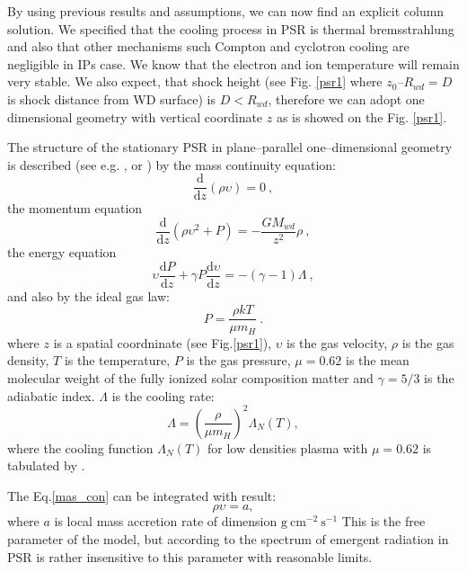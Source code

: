 \documentclass[oneside,a4paper,11pt]{report}
\begin{document}
By using previous results and assumptions, we can now find an explicit column solution. We specified 
that the cooling process in PSR is thermal bremsstrahlung and also that other mechanisms such Compton 
and cyclotron cooling are negligible in IPs case. We know that the electron and ion temperature will 
remain very stable. We also expect, that shock height (see Fig. \ref{psr1} where $z_0 – R_{wd} = D$ 
is shock distance from WD surface) is $D < R_{wd}$, therefore we can adopt one dimensional geometry 
with vertical coordinate $z$ as is showed on the Fig. \ref{psr1}.

The structure of the stationary PSR in plane--parallel one--dimensional geometry is described
(see e.g. \citet{2005A&A...435..191S}, \citet{1999MNRAS.306..684C} or \citet{accpower:1}) by the
mass continuity equation:
\begin{equation}
 \label{mas_con}
\frac{\mathrm{d}}{\mathrm{d}z}(\rho \upsilon) = 0   \:,
\end{equation}
the momentum equation
\begin{equation}
 \label{momentum_eq}
\frac{\mathrm{d}}{\mathrm{d}z}(\rho \upsilon^2 + P) = -\frac{GM_{wd}}{z^2}\rho             \:,
\end{equation}
the energy equation 
\begin{equation}
 \label{ener_eq}
\upsilon \frac{\mathrm{d}P}{\mathrm{d}z} + \gamma P \frac{\mathrm{d}\upsilon}{\mathrm{d}z} = -(\gamma -1)\Lambda    \:,
\end{equation}
and also by the ideal gas law:
\begin{equation}
 \label{ideal_gas_l}
P = \frac{\rho k T}{\mu m_H}   \:.
\end{equation}
where $z$ is a spatial coordninate (see Fig.\ref{psr1}), $\upsilon$ is the gas velocity, $\rho$ is the gas 
density, $T$ is the temperature, $P$ is the gas pressure, $\mu=0.62$ is the mean molecular weight of the fully
ionized solar composition matter and $\gamma = 5/3$ is the adiabatic index. $\Lambda$ is the cooling rate:
\begin{equation}
 \label{cool_rate_L}
\Lambda = \left( \frac{\rho}{\mu m_H}\right)^2 \Lambda_N(T),
\end{equation}
where the cooling function $\Lambda_N(T)$ for low densities plasma with $\mu=0.62$ is 
tabulated by \citet{1993ApJS...88..253S}.

The Eq.\eqref{mas_con} can be integrated with result:
\begin{equation}
 \label{res_int_mas_con}
\rho \upsilon = a,
\end{equation}
where $a$ is local mass accretion rate of dimension $\mathrm{g\:cm^{-2}\:s^{-1}}$
This is the free parameter of the model, but according to \citet{2005A&A...435..191S} the spectrum of 
emergent radiation in PSR is rather insensitive to this parameter with reasonable limits.     
\end{document}

